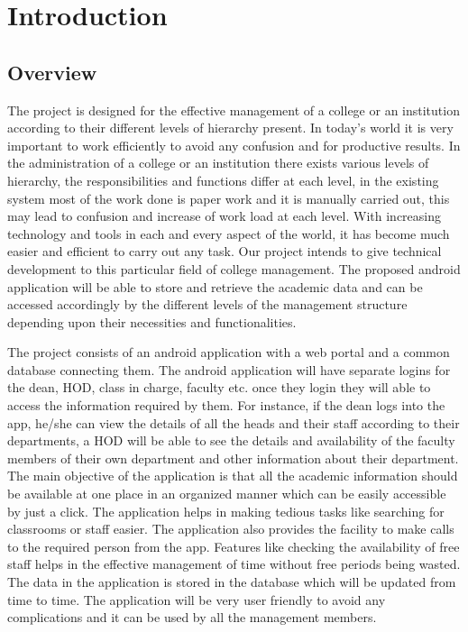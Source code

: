 \documentclass[BTech]{srmuthesis}
\begin{document}
\pagebreak
\clearpage



\chapter{Introduction}
\section{Overview}
The project is designed for the effective management of a college or an institution
according to their different levels of hierarchy present. In today's world it is very
important to work efficiently to avoid any confusion and for productive results. In the
administration of a college or an institution there exists various levels of hierarchy, the
responsibilities and functions differ at each level, in the existing system most of the work
done is paper work and it is manually carried out, this may lead to confusion and increase
of work load at each level. With increasing technology and tools in each and every aspect
of the world, it has become much easier and efficient to carry out any task. Our project
intends to give technical development to this particular field of college management. The
proposed android application will be able to store and retrieve the academic data and can
be accessed accordingly by the different levels of the management structure depending
upon their necessities and functionalities.

The project consists of an android application with a web portal and a common
database connecting them. The android application will have separate logins for the dean,
HOD, class in charge, faculty etc. once they login they will able to access the information required by them. For instance, if the dean logs into the app, he/she can view the details of all the heads and their staff according to their departments, a HOD will be able to see the details and availability of the faculty members of their own department and other information about their department. The main objective of the application is that all the academic information should be available at one place in an organized manner which can be easily accessible by just a click. The application helps in making tedious tasks like searching for classrooms or staff easier. The application also provides the facility to make calls to the required person from the app. Features like checking the availability of free staff helps in the effective management of time without free periods being wasted. The data in the application is stored in the database which will be updated from time to time. The application will be very user friendly to avoid any complications and it can be used by all the management members.
\end{document}
